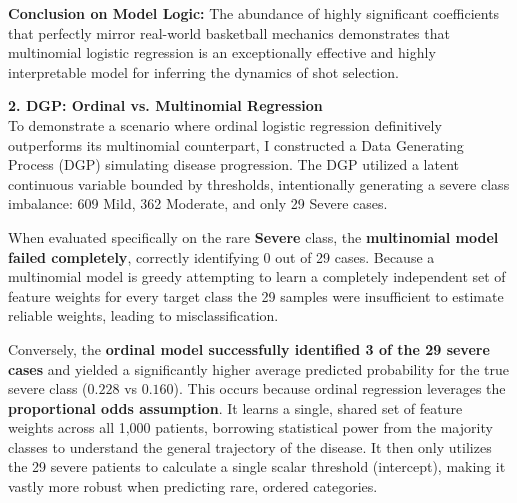 \documentclass[fleqn,moreauthors,10pt]{ds_report}
\begin{document}
\vspace{0.2cm}
\noindent \textbf{Conclusion on Model Logic:} The abundance of highly significant coefficients that perfectly mirror real-world basketball mechanics demonstrates that multinomial logistic regression is an exceptionally effective and highly interpretable model for inferring the dynamics of shot selection.
\vspace{0.3cm}

\textbf{2. DGP: Ordinal vs. Multinomial Regression}\\
To demonstrate a scenario where ordinal logistic regression definitively outperforms its multinomial counterpart, I constructed a Data Generating Process (DGP) simulating disease progression. The DGP utilized a latent continuous variable bounded by thresholds, intentionally generating a severe class imbalance: 609 Mild, 362 Moderate, and only 29 Severe cases. 

When evaluated specifically on the rare \textbf{Severe} class, the \textbf{multinomial model failed completely}, correctly identifying 0 out of 29 cases. Because a multinomial model is greedy attempting to learn a completely independent set of feature weights for every target class the 29 samples were insufficient to estimate reliable weights, leading to misclassification. 

Conversely, the \textbf{ordinal model successfully identified 3 of the 29 severe cases} and yielded a significantly higher average predicted probability for the true severe class ($0.228$ vs $0.160$). This occurs because ordinal regression leverages the \textbf{proportional odds assumption}. It learns a single, shared set of feature weights across all 1,000 patients, borrowing statistical power from the majority classes to understand the general trajectory of the disease. It then only utilizes the 29 severe patients to calculate a single scalar threshold (intercept), making it vastly more robust when predicting rare, ordered categories.
\end{document}
